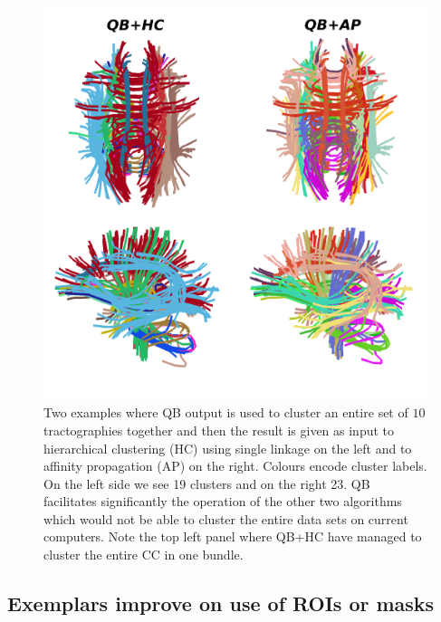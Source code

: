 \documentclass[preprint,authoryear,a4paper,10pt,onecolumn]{elsarticle}
\begin{document}
\begin{figure}
\begin{centering}
\includegraphics[scale=0.7]{last_figures/LSC_with_others}
\par\end{centering}
\caption{Two examples where QB output is used to cluster an entire set
  of $10$ tractographies together and then the result is given as input
  to hierarchical clustering (HC) using single linkage on the left and
  to affinity propagation (AP) on the right. Colours encode cluster
  labels. On the left side we see 19 clusters and on the right 23. QB
  facilitates significantly the operation of the other two algorithms
  which would not be able to cluster the entire data sets on current
  computers. Note the top left panel where QB+HC have managed to cluster
  the entire CC in one bundle.\label{Flo:LSC+HC+AP}}
\end{figure}


\subsection{Exemplars improve on use of ROIs or masks}
\end{document}
